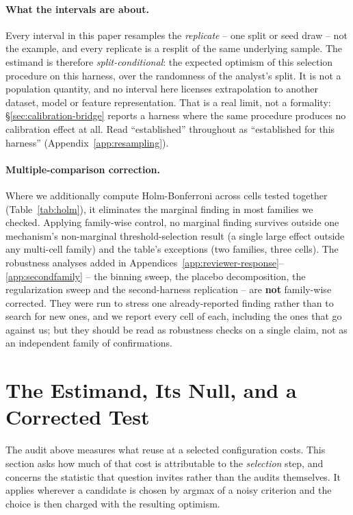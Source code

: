 \documentclass{article}
\begin{document}
\paragraph{What the intervals are about.} Every interval in this paper
resamples the \emph{replicate} -- one split or seed draw -- not the example,
and every replicate is a resplit of the same underlying sample. The estimand
is therefore \emph{split-conditional}: the expected optimism of this
selection procedure on this harness, over the randomness of the analyst's
split. It is not a population quantity, and no interval here licenses
extrapolation to another dataset, model or feature representation. That is a
real limit, not a formality: \S\ref{sec:calibration-bridge} reports a harness
where the same procedure produces no calibration effect at all. Read
``established'' throughout as ``established for this harness''
(Appendix~\ref{app:resampling}).

\paragraph{Multiple-comparison correction.} Where we additionally compute
Holm-Bonferroni across cells tested together (Table~\ref{tab:holm}), it
eliminates the marginal finding in most families we checked.
Applying family-wise control, no marginal finding survives outside
one mechanism's non-marginal threshold-selection result (a single large
effect outside any multi-cell family) and the table's exceptions (two
families, three cells). The robustness analyses added in
Appendices~\ref{app:reviewer-response}--\ref{app:secondfamily} -- the binning
sweep, the placebo decomposition, the regularization sweep and the
second-harness replication -- are \textbf{not} family-wise corrected. They
were run to stress one already-reported finding rather than to search for new
ones, and we report every cell of each, including the ones that go against us;
but they should be read as robustness checks on a single claim, not as an
independent family of confirmations.


\section{The Estimand, Its Null, and a Corrected Test}
\label{sec:estimand}

The audit above measures what reuse at a selected configuration costs. This
section asks how much of that cost is attributable to the \emph{selection}
step, and concerns the statistic that question invites rather than the audits
themselves. It applies wherever a candidate is chosen by argmax of a noisy
criterion and the choice is then charged with the resulting optimism.
\end{document}
